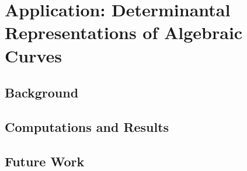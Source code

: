\chapter{Application: Determinantal Representations of Algebraic
  Curves}\label{ch:determinantal}

\section{Background}\label{sec:determinantal-introduction}

\section{Computations and
  Results}\label{sec:determinantal-computation-and-results}

\section{Future Work}\label{sec:determinantal-future-work}
